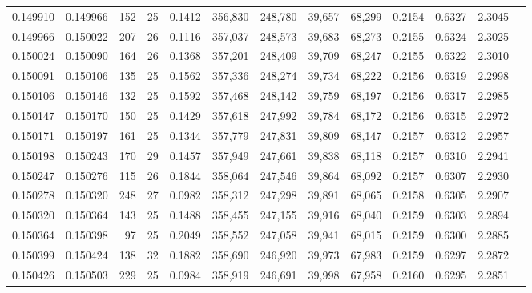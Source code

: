 \begin{tabular}{rrrrrrrrrrrrr}
0.149910 & 0.149966 & 152 &  25 &                                     0.1412 & 356,830 & 248,780 &  39,657 &  68,299 & 0.2154 & 0.6327 & 2.3045 \\
0.149966 & 0.150022 & 207 &  26 &                                     0.1116 & 357,037 & 248,573 &  39,683 &  68,273 & 0.2155 & 0.6324 & 2.3025 \\
0.150024 & 0.150090 & 164 &  26 &                                     0.1368 & 357,201 & 248,409 &  39,709 &  68,247 & 0.2155 & 0.6322 & 2.3010 \\
0.150091 & 0.150106 & 135 &  25 &                                     0.1562 & 357,336 & 248,274 &  39,734 &  68,222 & 0.2156 & 0.6319 & 2.2998 \\
0.150106 & 0.150146 & 132 &  25 &                                     0.1592 & 357,468 & 248,142 &  39,759 &  68,197 & 0.2156 & 0.6317 & 2.2985 \\
0.150147 & 0.150170 & 150 &  25 &                                     0.1429 & 357,618 & 247,992 &  39,784 &  68,172 & 0.2156 & 0.6315 & 2.2972 \\
0.150171 & 0.150197 & 161 &  25 &                                     0.1344 & 357,779 & 247,831 &  39,809 &  68,147 & 0.2157 & 0.6312 & 2.2957 \\
0.150198 & 0.150243 & 170 &  29 &                                     0.1457 & 357,949 & 247,661 &  39,838 &  68,118 & 0.2157 & 0.6310 & 2.2941 \\
0.150247 & 0.150276 & 115 &  26 &                                     0.1844 & 358,064 & 247,546 &  39,864 &  68,092 & 0.2157 & 0.6307 & 2.2930 \\
0.150278 & 0.150320 & 248 &  27 &                                     0.0982 & 358,312 & 247,298 &  39,891 &  68,065 & 0.2158 & 0.6305 & 2.2907 \\
0.150320 & 0.150364 & 143 &  25 &                                     0.1488 & 358,455 & 247,155 &  39,916 &  68,040 & 0.2159 & 0.6303 & 2.2894 \\
0.150364 & 0.150398 &  97 &  25 &                                     0.2049 & 358,552 & 247,058 &  39,941 &  68,015 & 0.2159 & 0.6300 & 2.2885 \\
0.150399 & 0.150424 & 138 &  32 &                                     0.1882 & 358,690 & 246,920 &  39,973 &  67,983 & 0.2159 & 0.6297 & 2.2872 \\
0.150426 & 0.150503 & 229 &  25 &                                     0.0984 & 358,919 & 246,691 &  39,998 &  67,958 & 0.2160 & 0.6295 & 2.2851 \\

\end{tabular}
